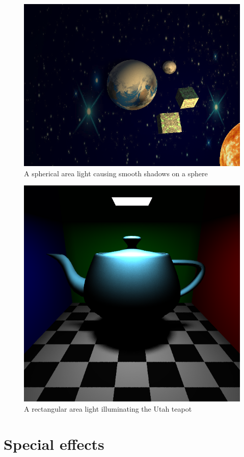 \begin{figure}
\centering
\includegraphics[width=0.5\linewidth]{./img/borgEarth3}
\caption{A spherical area light causing smooth shadows on a sphere}
\label{fig:borgEarth}
\end{figure}
\begin{figure}
\centering
\includegraphics[width=0.5\linewidth]{./img/areaTeapot}
\caption{A rectangular area light illuminating the Utah teapot}
\label{fig:areaTeapot}
\end{figure}


\section{Special effects}
